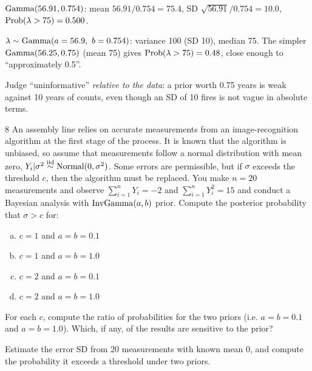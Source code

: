 \documentclass[11pt]{article}
\begin{document}
\begin{sanity}
$\mathrm{Gamma}(56.91,0.754)$: mean $56.91/0.754=75.4$, SD $\sqrt{56.91}/0.754=10.0$, $\mathrm{Prob}(\lambda>75)=0.500$. \checkmark
\end{sanity}

\begin{answer}
$\lambda\sim\dist{Gamma}(a=56.9,\ b=0.754)$: variance 100 (SD 10), median 75. The simpler $\mathrm{Gamma}(56.25,0.75)$ (mean 75) gives $\mathrm{Prob}(\lambda>75)=0.48$, close enough to ``approximately 0.5''.
\end{answer}

\begin{takeaway}
Judge ``uninformative'' \emph{relative to the data}: a prior worth 0.75 years is weak against 10 years of counts, even though an SD of 10 fires is not vague in absolute terms.
\end{takeaway}


\begin{problem}{8}
An assembly line relies on accurate measurements from an image-recognition algorithm at the first stage of the process. It is known that the algorithm is unbiased, so assume that measurements follow a normal distribution with mean zero, $Y_i|\sigma^2\stackrel{\text{iid}}{\sim}\mathrm{Normal}(0,\sigma^2)$. Some errors are permissible, but if $\sigma$ exceeds the threshold $c$, then the algorithm must be replaced. You make $n=20$ measurements and observe $\sum_{i=1}^nY_i=-2$ and $\sum_{i=1}^nY_i^2=15$ and conduct a Bayesian analysis with $\mathrm{InvGamma}(a,b)$ prior. Compute the posterior probability that $\sigma>c$ for:
\begin{enumerate}[(a)]
\item $c=1$ and $a=b=0.1$
\item $c=1$ and $a=b=1.0$
\item $c=2$ and $a=b=0.1$
\item $c=2$ and $a=b=1.0$
\end{enumerate}
For each $c$, compute the ratio of probabilities for the two priors (i.e. $a=b=0.1$ and $a=b=1.0$). Which, if any, of the results are sensitive to the prior?
\end{problem}

\begin{restate}
Estimate the error SD from 20 measurements with known mean 0, and compute the probability it exceeds a threshold under two priors.
\end{restate}
\end{document}

